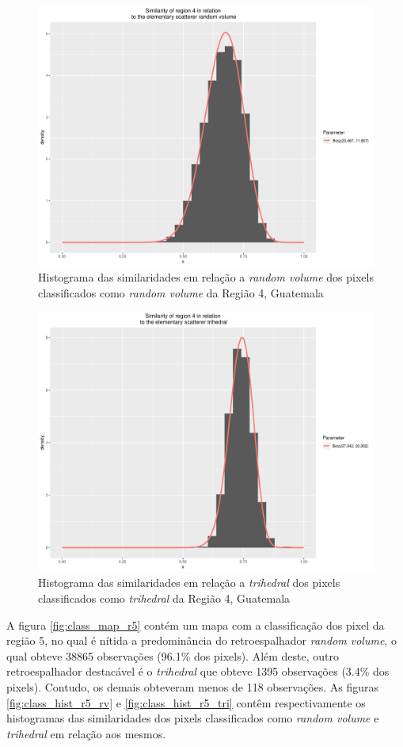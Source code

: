 \documentclass[12pt]{article}
\begin{document}
\begin{figure}[!h]
    \centering   
    \includegraphics[width = 0.8\linewidth]{../../Images/Report_18_12_20/Classifier_Geo_Dist/Histograms/Guate/region4_rv_sm_filter.pdf}
    \caption{Histograma das similaridades em relação a \textit{random volume} dos pixels classificados como \textit{random volume} da Região 4, Guatemala}
    \label{fig:class_hist_r4_rv}
\end{figure}

\begin{figure}[!h]
    \centering    
    \includegraphics[width = 0.78\linewidth]{../../Images/Report_18_12_20/Classifier_Geo_Dist/Histograms/Guate/region4_tri_sm_filter.pdf}
    \caption{Histograma das similaridades em relação a \textit{trihedral} dos pixels classificados como \textit{trihedral} da Região 4, Guatemala}
    \label{fig:class_hist_r4_tri}
\end{figure}

A figura \ref{fig:class_map_r5} contém um mapa com a classificação dos pixel da região 5, no qual é nítida a predominância do retroespalhador \textit{random volume}, o qual obteve 38865 observações (96.1\% dos pixels). Além deste, outro retroespalhador destacável é o \textit{trihedral} que obteve 1395 observações (3.4\% dos pixels). Contudo, os demais obteveram menos de 118 observações. As figuras \ref{fig:class_hist_r5_rv} e \ref{fig:class_hist_r5_tri} contêm respectivamente os histogramas das similaridades dos pixels classificados como \textit{random volume} e \textit{trihedral} em relação aos mesmos.
\end{document}
